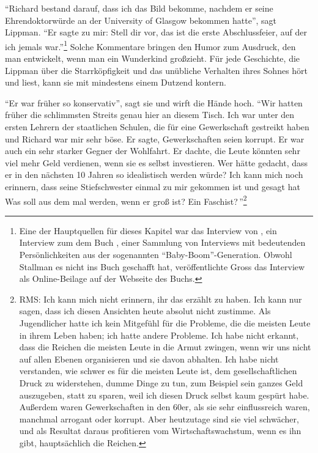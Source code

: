 "`Richard bestand darauf, dass ich das Bild bekomme, nachdem er seine Ehrendoktorwürde an der University of Glasgow bekommen hatte"', sagt Lippman. "`Er sagte zu mir: \glq Stell dir vor, das ist die erste Abschlussfeier, auf der ich jemals war.\grq "'\footnote{Eine der Hauptquellen für dieses Kapitel war das Interview von 
\cite[][]{rmshsm}, ein Interview zum dem Buch , einer Sammlung von Interviews mit bedeutenden Persönlichkeiten aus der sogenannten "`Baby-Boom"'-Generation. Obwohl Stallman es nicht ins Buch geschafft hat, veröffentlichte Gross das Interview als Online-Beilage auf der Webseite des Buchs.}
Solche Kommentare bringen den Humor zum Ausdruck, den man entwickelt, wenn man ein Wunderkind großzieht. Für jede Geschichte, die Lippman über die Starrköpfigkeit und das unübliche Verhalten ihres Sohnes hört und liest, kann sie mit mindestens einem Dutzend kontern.

"`Er war früher so konservativ"', sagt sie und wirft die Hände hoch. "`Wir hatten früher die schlimmsten Streits genau hier an diesem Tisch. Ich war unter den ersten Lehrern der staatlichen Schulen, die für eine Gewerkschaft gestreikt haben und Richard war mir sehr böse. Er sagte, Gewerkschaften seien korrupt. Er war auch ein sehr starker Gegner der Wohlfahrt. Er dachte, die Leute könnten sehr viel mehr Geld verdienen, wenn sie es selbst investieren. Wer hätte gedacht, dass er in den nächsten 10 Jahren so idealistisch werden würde? Ich kann mich noch erinnern, dass seine Stiefschwester einmal zu mir gekommen ist und gesagt hat \glq Was soll aus dem mal werden, wenn er groß ist? Ein Faschist?{}\grq\,"'\footnote{RMS: Ich kann mich nicht erinnern, ihr das erzählt zu haben. Ich kann nur sagen, dass ich diesen Ansichten heute absolut nicht zustimme. Als Jugendlicher hatte ich kein Mitgefühl für die Probleme, die die meisten Leute in ihrem Leben haben; ich hatte andere Probleme. Ich habe nicht erkannt, dass die Reichen die meisten Leute in die Armut zwingen, wenn wir uns nicht auf allen Ebenen organisieren und sie davon abhalten. Ich habe nicht verstanden, wie schwer es für die meisten Leute ist, dem gesellschaftlichen Druck zu widerstehen, dumme Dinge zu tun, zum Beispiel sein ganzes Geld auszugeben, statt zu sparen, weil ich diesen Druck selbst kaum gespürt habe. Außerdem waren Gewerkschaften in den 60er, als sie sehr einflussreich waren, manchmal arrogant oder korrupt. Aber heutzutage sind sie viel schwächer, und als Resultat daraus profitieren vom Wirtschaftswachstum, wenn es ihn gibt, hauptsächlich die Reichen.}

